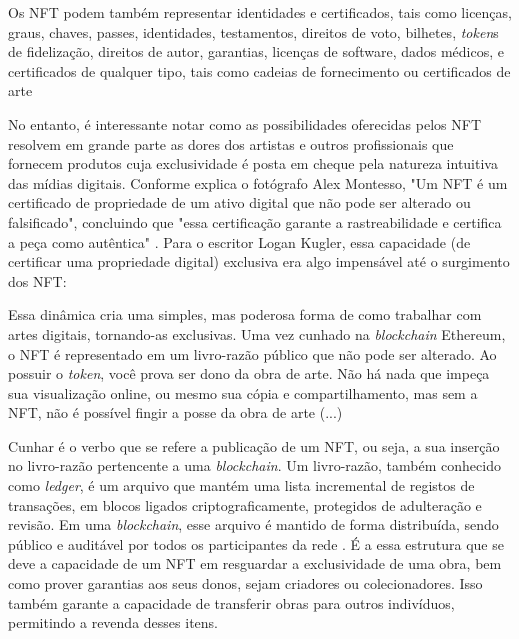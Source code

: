 \begin{citacao}
	 Os NFT podem também representar identidades e certificados, tais como licenças, graus, chaves, passes, identidades, testamentos, direitos de voto, bilhetes, \textit{token}s de fidelização, direitos de autor, garantias, licenças de software, dados médicos, e certificados de qualquer tipo, tais como cadeias de fornecimento ou certificados de arte \cite{Voshmgir}
\end{citacao}

No entanto, é interessante notar como as possibilidades oferecidas pelos NFT resolvem em grande parte as dores dos artistas e outros profissionais que fornecem produtos cuja exclusividade é posta em cheque pela natureza intuitiva das mídias digitais. Conforme explica o fotógrafo Alex Montesso, "Um NFT é um certificado de propriedade de um ativo digital que não pode ser alterado ou falsificado", concluindo que "essa certificação garante a rastreabilidade e certifica a peça como autêntica" \cite{Montesso}. Para o escritor Logan Kugler, essa capacidade (de certificar uma propriedade digital) exclusiva era algo impensável até o surgimento dos NFT: 

\begin{citacao}
Essa dinâmica cria uma simples, mas poderosa forma de como trabalhar com artes digitais, tornando-as exclusivas. Uma vez cunhado na \textit{blockchain} Ethereum, o NFT é representado em um livro-razão público que não pode ser alterado. Ao possuir o \textit{token}, você prova ser dono da obra de arte. Não há nada que impeça sua visualização online, ou mesmo sua cópia e compartilhamento, mas sem a NFT, não é possível fingir a posse da obra de arte (...) \cite{Kugler}
\end{citacao}

Cunhar é o verbo que se refere a publicação de um NFT, ou seja, a sua inserção no livro-razão pertencente a uma \textit{blockchain}. Um livro-razão, também conhecido como \textit{ledger}, é um arquivo que mantém uma lista incremental de registos de transações, em blocos ligados criptograficamente, protegidos de adulteração e revisão. Em uma \textit{blockchain}, esse arquivo é mantido de forma distribuída, sendo público e auditável por todos os participantes da rede \cite{Voshmgir, Lyra}. É a essa estrutura que se deve a capacidade de um NFT em resguardar a exclusividade de uma obra, bem como prover garantias aos seus donos, sejam criadores ou colecionadores. Isso também garante a capacidade de transferir obras para outros indivíduos, permitindo a revenda desses itens.

